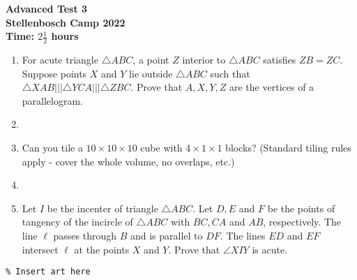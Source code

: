 \documentclass{article}
\begin{document}
\thispagestyle{empty}

\begin{center}
  \textbf{\Large Advanced Test 3}
  \\ \vspace{1em}
  \textbf{\large Stellenbosch Camp 2022}
  \\ \vspace{1em}
  \textbf{\large Time: $2\frac{1}{2}$ hours}
\end{center}

\bigskip

\begin{enumerate}[itemsep=\fill]

\item %
For acute triangle $\triangle ABC$, a point $Z$ interior to $\triangle ABC$ satisfies $ZB=ZC$. Suppose points $X$ and $Y$ lie outside $\triangle ABC$ such that $\triangle XAB |||\triangle YCA |||\triangle ZBC$. Prove that $A,X,Y,Z$ are the vertices of a parallelogram.

\item %


\item %
Can you tile a $10\times 10\times 10$ cube with $4\times 1\times 1$ blocks? (Standard tiling rules apply - cover the whole volume, no overlaps, etc.)


\item %


\item %
Let $I$ be the incenter of triangle $\triangle ABC$. Let $D,E$ and $F$ be the points of tangency of the incircle of $\triangle ABC$ with $BC,CA$ and $AB$, respectively. The line $\ell$ passes through $B$ and is parallel to $DF$. The lines $ED$ and $EF$ intersect $\ell$ at the points $X$ and $Y$. Prove that $\angle XIY$ is acute.
\end{enumerate}


\centering
\small
\begin{BVerbatim}
\end{BVerbatim}
\end{document}
